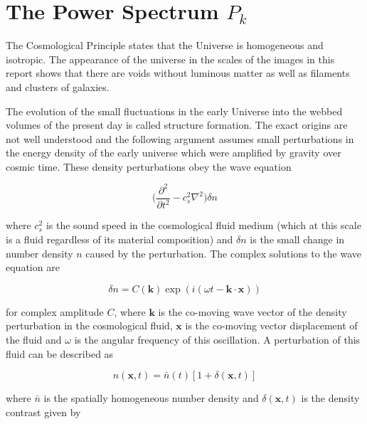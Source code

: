 \documentclass[twocolumn]{article}
\numberwithin{equation}{section}
\begin{document}
\section{The Power Spectrum $P_k$}\label{appendix:power_spectrum} %
The Cosmological Principle states that the Universe is homogeneous and isotropic. The appearance of the universe in the scales of the images in this report shows that there are voids without luminous matter as well as filaments and clusters of galaxies.


The evolution of the small fluctuations in the early Universe into the webbed volumes of the present day is called structure formation. The exact origins are not well understood and the following argument assumes small perturbations in the energy density of the early universe which were amplified by gravity over cosmic time. These density perturbations obey the wave equation 

\begin{equation}
    \bigg ( \frac{\partial^2}{\partial t^2} - c_s^2\nabla^2\bigg )\delta n
\end{equation}

where $c_s^2$ is the sound speed in the cosmological fluid medium (which at this scale is a fluid regardless of its material composition) and $\delta n$ is the small change in number density $n$ caused by the perturbation. The complex solutions to the wave equation are 

\begin{equation}
    \delta n = C(\mathbf{k})\exp(i(\omega t - \mathbf{k}\cdot\mathbf{x}))
\end{equation}

for complex amplitude $C$, where $\mathbf{k}$ is the co-moving wave vector of the density perturbation in the cosmological fluid, $\mathbf{x}$ is the co-moving vector displacement of the fluid and $\omega$ is the angular frequency of this oscillation. A perturbation of this fluid can be described as

\begin{equation}
    n(\mathbf{x},t) = \bar{n}(t)[1+\delta(\mathbf{x},t)]
\end{equation}

where $\bar{n}$ is the spatially homogeneous number density and $\delta(\mathbf{x},t)$ is the density contrast given by
\end{document}
